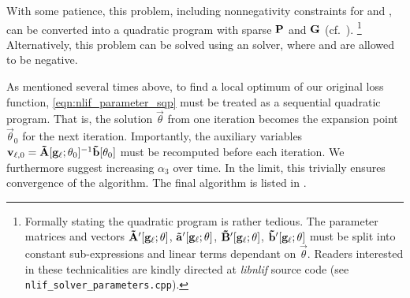 With some patience, this problem, including nonnegativity constraints for \vrap and \mrAp, can be converted into a quadratic program with sparse $\mathbf{P}$ and $\mathbf{G}$ (cf.~).%
\footnote{
Formally stating the quadratic program is rather tedious.
The parameter matrices and vectors $\mathbf{\tilde A}'[\mathbf{g}_\ell; \mathbf{\theta}]$, $\mathbf{\tilde a}'[\mathbf{g}_\ell; \mathbf{\theta}]$, $\mathbf{\tilde B}'[\mathbf{g}_\ell; \mathbf{\theta}]$, $\mathbf{\tilde b}'[\mathbf{g}_\ell; \mathbf{\theta}]$ must be split into constant sub-expressions and linear terms dependant on $\vec \theta$.
Readers interested in these technicalities are kindly directed at \emph{libnlif} source code (see \texttt{nlif\_solver\_parameters.cpp}).
}
Alternatively, this problem can be solved using an \NNLS solver, where \vrbp and \mrBp are allowed to be negative.

As mentioned several times above, to find a local optimum of our original loss function, \cref{eqn:nlif_parameter_sqp} must be treated as a sequential quadratic program.
That is, the solution $\vec \theta$ from one iteration becomes the expansion point $\vec \theta_0$ for the next iteration.
Importantly, the auxiliary variables $\mathbf{v}_{\ell, 0} = \mathbf{\tilde A}[\mathbf{g}_\ell; \mathbf{\theta}_0]^{-1} \mathbf{\tilde b}[\mathbf{\theta}_0]$ must be recomputed before each iteration.
We furthermore suggest increasing $\alpha_3$ over time.
In the limit, this trivially ensures convergence of the algorithm.
The final algorithm is listed in .

